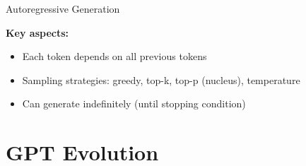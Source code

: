 \documentclass[aspectratio=169]{beamer}
\begin{document}
\begin{frame}{Autoregressive Generation 🔮}
\vspace{0.5em}

\textbf{Key aspects:}
\begin{itemize}
    \item Each token depends on all previous tokens
    \item Sampling strategies: greedy, top-k, top-p (nucleus), temperature
    \item Can generate indefinitely (until stopping condition)
\end{itemize}
\end{frame}

\section{GPT Evolution}
\end{document}
